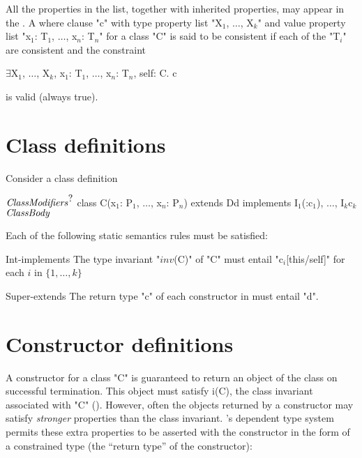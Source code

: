 All the properties in the list, together with inherited properties,
may appear in the . A where clause \xcd"c" with
type property list \xcdmath"X$_1$, $\dots$, X$_k$"
and value property list \xcdmath"x$_1$: T$_1$, $\dots$, x$_n$: T$_n$"
for a class \xcd"C" is said to be consistent if each of the \xcdmath"T$_i$" are
consistent and the constraint
\begin{xtenmath}
$\exists$X$_1$, $\dots$, X$_k$, x$_1$: T$_1$, $\dots$, x$_n$: T$_n$, self: C. c
\end{xtenmath}
\noindent is valid (always true).

\section{Class definitions}

Consider a class definition
\begin{xtenmath}
$\mbox{\emph{ClassModifiers}}^{\mbox{?}}$
class C(x$_1$: P$_1$, $\dots$, x$_n$: P$_n$) extends D{d}
   implements I$_1$(:c$_1$), $\dots$, I$_k${c$_k$}
$\mbox{\emph{ClassBody}}$
\end{xtenmath}

Each of the following static semantics rules must be satisfied:

\begin{staticrule}{Int-implements}
The type invariant \xcdmath"$\mathit{inv}$(C)" of \xcd"C" must entail
\xcdmath"c$_i$[this/self]" for each $i$ in $\{1, \dots, k\}$
\end{staticrule}

\begin{staticrule}{Super-extends}
The return type \xcd"c" of each constructor in 
must entail \xcd"d".
\end{staticrule}

\section{Constructor definitions}

A constructor for a class \xcd"C" is guaranteed to return an object of the
class on successful termination. This object must satisfy i(C), the
class invariant associated with \xcd"C" ().
However,
often the objects returned by a constructor may satisfy {\em stronger}
properties than the class invariant. \Xten{}'s dependent type system
permits these extra properties to be asserted with the constructor in
the form of a constrained type (the ``return type'' of the constructor):


